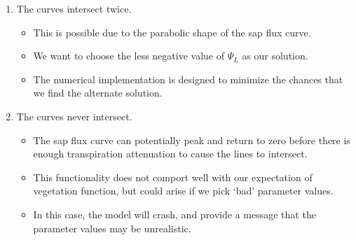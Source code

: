 \documentclass[11pt]{article}
\begin{document}
\begin{enumerate}
\item The curves intersect twice.
	\begin{itemize}
	\item This is possible due to the parabolic shape of the sap flux curve.
	\item We want to choose the less negative value of $\Psi_L$ as our solution.
	\item The numerical implementation is designed to minimize the chances that we find the alternate solution.
	\end{itemize}
\item The curves never intersect.
	\begin{itemize}
	\item The sap flux curve can potentially peak and return to zero before there is enough transpiration attenuation to cause the lines to intersect.
	\item This functionality does not comport well with our expectation of vegetation function, but could arise if we pick `bad' parameter values.
	\item In this case, the model will crash, and provide a message that the parameter values may be unrealistic.
	\end{itemize}
\end{enumerate}




\clearpage

\nocite{*}


\end{document}
